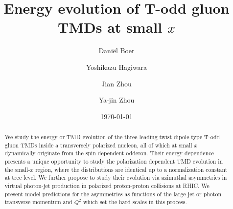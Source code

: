 \documentclass[prd,aps,preprintnumbers,fleqn,showpacs,nofootinbib,superscriptaddress]{revtex4}
\begin{document}

\title{Energy evolution of T-odd gluon TMDs at small $x$}



\author{Dani\"el Boer}

\author{Yoshikazu Hagiwara}


\author{Jian Zhou}

\author{Ya-jin Zhou}

\begin{abstract}
  We study the energy or TMD evolution of the three leading twist dipole type T-odd gluon TMDs inside a transversely polarized nucleon, all of which at small $x$ dynamically originate from the spin dependent odderon. Their energy dependence presents a unique opportunity to study the polarization dependent TMD evolution in the small-$x$ region, where the distributions are identical up to a normalization constant at tree level. We further propose to study their evolution via azimuthal asymmetries in virtual photon-jet production in polarized proton-proton collisions at RHIC. We present model predictions for the asymmetries as functions of the large jet or photon transverse momentum and $Q^2$ which set the hard scales in this process.
  \end{abstract}
  
  \date{\today}
  
  \maketitle
  
\end{document}
